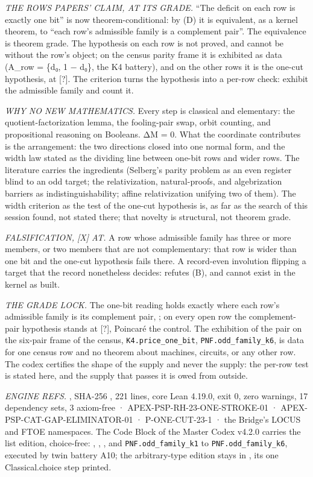 \documentclass[10pt,twocolumn]{article}
\begin{document}
\emph{THE ROWS PAPERS' CLAIM, AT ITS GRADE.} ``The deficit on each row
is exactly one bit'' is now theorem-conditional: by (D) it is
equivalent, as a kernel theorem, to ``each row's admissible family is a
complement pair''. The equivalence is theorem grade. The hypothesis on
each row is not proved, and cannot be without the row's object; on the
census parity frame it is exhibited as data (A\_row = \{d₀, 1 − d₀\},
the K4 battery), and on the other rows it is the one-cut hypothesis, at
{[}?{]}. The criterion turns the hypothesis into a per-row check:
exhibit the admissible family and count it.

\emph{WHY NO NEW MATHEMATICS.} Every step is classical and elementary:
the quotient-factorization lemma, the fooling-pair swap, orbit counting,
and propositional reasoning on Booleans. ΔM = 0. What the coordinate
contributes is the arrangement: the two directions closed into one
normal form, and the width law stated as the dividing line between
one-bit rows and wider rows. The literature carries the ingredients
(Selberg's parity problem as an even register blind to an odd target;
the relativization, natural-proofs, and algebrization barriers as
indistinguishability; affine relativization unifying two of them). The
width criterion as the test of the one-cut hypothesis is, as far as the
search of this session found, not stated there; that novelty is
structural, not theorem grade.

\emph{FALSIFICATION, {[}X{]} AT.} A row whose admissible family has
three or more members, or two members that are not complementary: that
row is wider than one bit and the one-cut hypothesis fails there. A
record-even involution flipping a target that the record nonetheless
decides: refutes (B), and cannot exist in the kernel as built.

\emph{THE GRADE LOCK.} The one-bit reading holds exactly where each
row's admissible family is its complement pair,
\texttt{}; on every
open row the complement-pair hypothesis stands at {[}?{]}, Poincaré the
control. The exhibition of the pair on the six-pair frame of the census,
\texttt{K4.price\_one\_bit}, \texttt{PNF.odd\_family\_k6}, is data for
one census row and no theorem about machines, circuits, or any other
row. The codex certifies the shape of the supply and never the supply:
the per-row test is stated here, and the supply that passes it is owed
from outside.

\emph{ENGINE REFS.} \texttt{},
SHA-256 \texttt{}, 221 lines, core Lean
4.19.0, exit 0, zero warnings, 17 dependency sets, 3 axiom-free ·
APEX-PSP-RH-23-ONE-STROKE-01 · APEX-PSP-CAT-GAP-ELIMINATOR-01 ·
P-ONE-CUT-23-1 · the Bridge's LOCUS and FTOE namespaces. The Code Block
of the Master Codex v4.2.0 carries the list edition, choice-free:
\texttt{},
\texttt{},
\texttt{}, and
\texttt{PNF.odd\_family\_k1} to \texttt{PNF.odd\_family\_k6}, executed
by twin battery A10; the arbitrary-type edition stays in
\texttt{}, its one Classical.choice
step printed.
\end{document}
